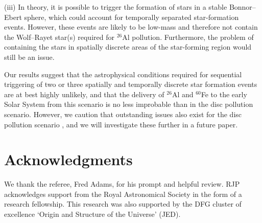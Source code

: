 \documentclass[useAMS,usenatbib,usegraphicx]{mn2e}
\begin{document}
(iii) In theory, it is possible to trigger the formation of stars in a stable Bonnor--Ebert sphere, which could account for temporally separated star-formation events. However, these events are likely to be low-mass and therefore not contain the Wolf--Rayet star(s) required for $^{26}$Al pollution. Furthermore, the problem of containing the stars in spatially discrete areas of the star-forming region would still be an issue.

Our results suggest that the astrophysical conditions required for sequential triggering of two or three spatially and temporally discrete star formation events are at best highly unlikely, and that the delivery of $^{26}$Al and $^{60}$Fe to the early Solar System from this scenario is no less improbable than in the disc pollution scenario. However, we caution that outstanding issues also exist for the disc pollution scenario \citep{Gounelle08,Parker14a}, and we will investigate these further in a future paper.

\section*{Acknowledgments}

We thank the referee, Fred Adams, for his prompt and helpful review. RJP acknowledges support from the Royal Astronomical Society in the form of a research fellowship. This research was also supported by the DFG cluster of excellence `Origin and Structure of the Universe' (JED). 




\label{lastpage}
\end{document}
